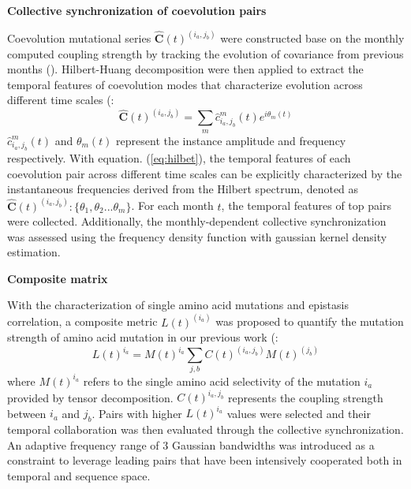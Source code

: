\documentclass{sysbio}%
\begin{document}
\vspace{1.0em}

\textbf{Collective synchronization of coevolution pairs}

Coevolution mutational series $\hat{\bm{C}}(t)^{(i_a,j_b)}$ were constructed base on the monthly computed coupling strength  by tracking the evolution of covariance from previous months  (\cite{linear_al}). Hilbert-Huang decomposition were then applied to extract the temporal features of coevolution modes that characterize evolution across different time scales (\cite{huang2014hilbert}:
\begin{equation}
    \hat{\bm{C}}(t)^{(i_a,j_b)}=\sum_m \hat{c}_{i_a,j_b}^m (t) e^{i\theta_m(t)}
\label{eq:hilbet}
\end{equation}
$\hat{c}_{i_a,j_b}^m (t) $ and $\theta_m(t)$ represent the instance amplitude and frequency respectively. %
With equation. (\ref{eq:hilbet}), the temporal features of each coevolution pair across different time scales can be explicitly characterized by the instantaneous frequencies derived from the Hilbert spectrum, denoted as $\hat{\bm{C}}(t)^{(i_a,j_b)}: \{\theta_1,\theta_2 ...\theta_m\}$. 
For each month $t$, the temporal features of top pairs were collected. Additionally, the monthly-dependent collective synchronization was assessed using the frequency density function with gaussian kernel density estimation. 

\vspace{1.0em}

\textbf{Composite matrix}

With the characterization of single amino acid mutations and epistasis correlation, a composite metric $L(t)^{(i_a)}$ was proposed to quantify the mutation strength of amino acid mutation in our previous work (\cite{dynamic_exp}:
\begin{equation}
    L(t)^{i_a} = M(t)^{i_a} \sum_{j,b} C(t)^{(i_a,j_b)} M(t)^{(j_b)}
\end{equation}
where $M(t)^{i_a}$ refers to the single amino acid selectivity of the mutation $i_a$ provided by tensor decomposition. $C(t)^{i_a,j_b}$ represents the coupling strength between $i_a$ and $j_b$. Pairs with higher $L(t)^{i_a}$ values were selected and their temporal collaboration was then evaluated through the collective synchronization. An adaptive frequency range of 3 Gaussian bandwidths was introduced as a constraint to leverage leading pairs that have been intensively cooperated both in temporal and sequence space. 
\end{document}
